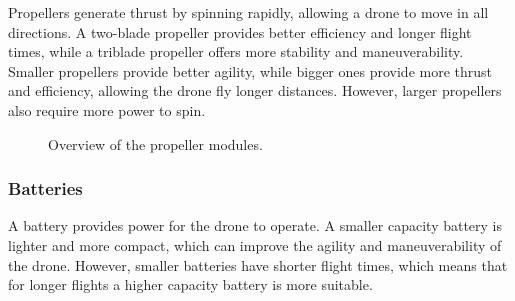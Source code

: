 \documentclass[sigconf,review]{acmart}
\begin{document}
Propellers generate thrust by spinning rapidly, allowing a drone to move in all directions. 
A two-blade propeller provides better efficiency and longer flight times, while a triblade propeller offers more stability and maneuverability. 
Smaller propellers provide better agility, while bigger ones provide more thrust and efficiency, allowing the drone fly longer distances. 
However, larger propellers also require more power to spin.

\begin{figure}[htbp]
    \hfill
    \hfill
    \caption{Overview of the propeller modules.}
    \label{fig:propeller}
\end{figure}

\subsubsection{Batteries}
\label{sec:batteries}

A battery provides power for the drone to operate. 
A smaller capacity battery is lighter and more compact, which can improve the agility and maneuverability of the drone. 
However, smaller batteries have shorter flight times, which means that for longer flights a higher capacity battery is more suitable.
\end{document}
